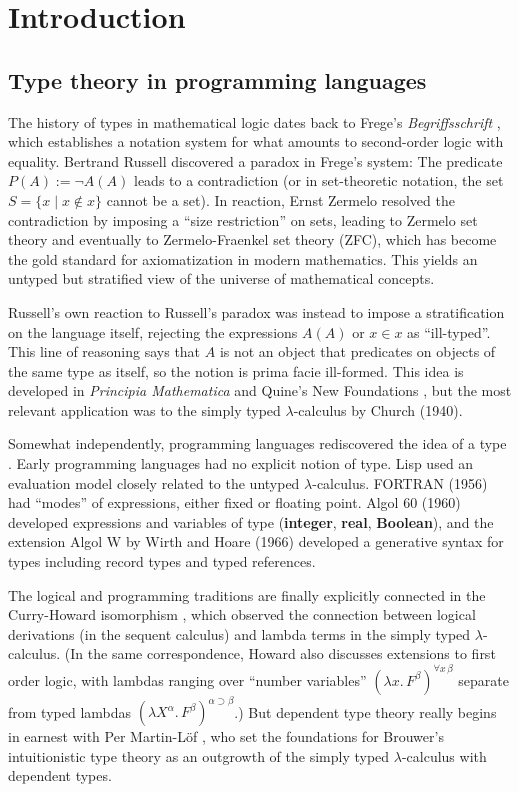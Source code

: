 \section{Introduction}
\subsection{Type theory in programming languages}
The history of types in mathematical logic dates back to Frege's \emph{Begriffsschrift} \cite{frege}, which establishes a notation system for what amounts to second-order logic with equality. Bertrand Russell discovered a paradox in Frege's system: The predicate $P(A):=\neg A(A)$ leads to a contradiction (or in set-theoretic notation, the set $S=\{x\mid x\notin x\}$ cannot be a set). In reaction, Ernst Zermelo resolved the contradiction by imposing a ``size restriction'' on sets, leading to Zermelo set theory and eventually to Zermelo-Fraenkel set theory (ZFC), which has become the gold standard for axiomatization in modern mathematics. This yields an untyped but stratified view of the universe of mathematical concepts.

Russell's own reaction to Russell's paradox was instead to impose a stratification on the language itself, rejecting the expressions $A(A)$ or $x\in x$ as ``ill-typed''. This line of reasoning says that $A$ is not an object that predicates on objects of the same type as itself, so the notion is prima facie ill-formed. This idea is developed in \emph{Principia Mathematica} \cite{principia} and Quine's New Foundations \cite{quinenf}, but the most relevant application was to the simply typed $\lambda$-calculus \cite{churchstt} by Church (1940).

Somewhat independently, programming languages rediscovered the idea of a type \cite{typesoftypes}. Early programming languages had no explicit notion of type. Lisp used an evaluation model closely related to the untyped $\lambda$-calculus. FORTRAN (1956) had ``modes'' of expressions, either fixed or floating point. Algol 60 (1960) developed expressions and variables of type (\textbf{integer}, \textbf{real}, \textbf{Boolean}), and the extension Algol W by Wirth and Hoare (1966) developed a generative syntax for types including record types and typed references.

The logical and programming traditions are finally explicitly connected in the Curry-Howard isomorphism \cite{curryhoward}, which observed the connection between logical derivations (in the sequent calculus) and lambda terms in the simply typed $\lambda$-calculus. (In the same correspondence, Howard also discusses extensions to first order logic, with lambdas ranging over ``number variables'' $(\lambda x.\,F^\beta)^{\forall x\,\beta}$ separate from typed lambdas $(\lambda X^\alpha.\,F^\beta)^{\alpha\supset\beta}$.) But dependent type theory really begins in earnest with Per Martin-L\"{o}f \cite{martinlof}, who set the foundations for Brouwer's intuitionistic type theory as an outgrowth of the simply typed $\lambda$-calculus with dependent types.

